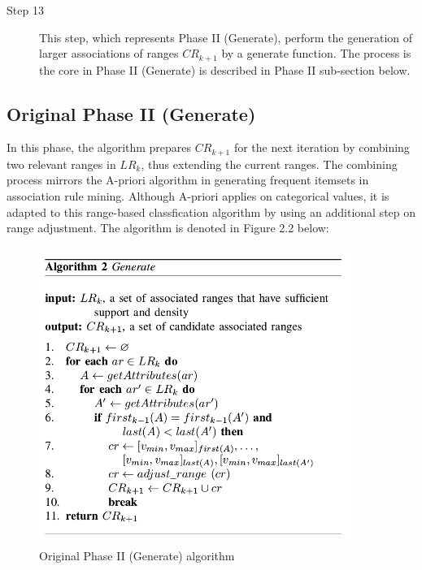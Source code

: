 \begin{description}
\item[Step 13] This step, which represents Phase II (Generate), perform the generation of larger associations of ranges $CR_{k+1}$ by a generate function. The process is the core in Phase II (Generate) is described in Phase II sub-section below.
\end{description}

\subsection{Original Phase II (Generate)}
In this phase, the algorithm prepares $CR_{k+1}$ for the next iteration by combining two relevant ranges in $LR_k$, thus extending the current ranges. The combining process mirrors the A-priori algorithm in generating frequent itemsets in association rule mining. Although A-priori applies on categorical values, it is adapted to this range-based classfication algorithm by using an additional step on range adjustment. The algorithm is denoted in Figure 2.2 below: \\

\begin{figure}[!htbp]
    \centering
    \includegraphics[width=4in]{figures/DrShaoAlgorithm2}
    \caption[Figure 2.2: Original Phase II (Generate) algorithm]{Original Phase II (Generate) algorithm}
    \label{fig:figure2_2}
\end{figure}

